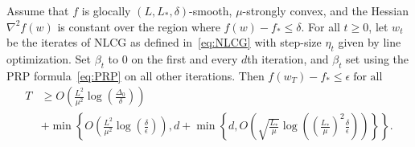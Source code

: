 \documentclass[10pt]{article} %
\begin{document}
\begin{theorem}
    \label{thm:NLCG}
    Assume that $f$ is glocally $(L, L_*, \delta)$-smooth, $\mu$-strongly convex, and the Hessian $\nabla^2 f(w)$ is constant over the region where $f(w)-f_* \leq \delta$. For all $t \geq 0$, let $w_t$ be the iterates of NLCG as defined in~\eqref{eq:NLCG} with step-size $\eta_t$ given by line optimization. Set $\beta_t$ to $0$ on the first and every $d$th iteration, and $\beta_t$ set using the PRP formula~\eqref{eq:PRP} on all other iterations. Then $f(w_T) - f_* \leq \epsilon \;\text{for all}$
    \begin{align*}
        T & \geq
        O\left(\frac{L^2}{\mu^2}\log\left(\frac{\Delta_{0}}{\delta}\right)\right)\\
        & + 
        \min\left\{O\left(\frac{L^2}{\mu^2}\log\left(\frac{\delta}{\epsilon}\right)\right), 
         d  + \min\left\{d,O\left(\sqrt{\frac{L_*}{\mu}}\log\left(\left(\frac{L_*}{\mu}\right)^2\frac{\delta}{\epsilon}\right)\right)\right\}\right\}.
    \end{align*}
\end{theorem}
\end{document}
